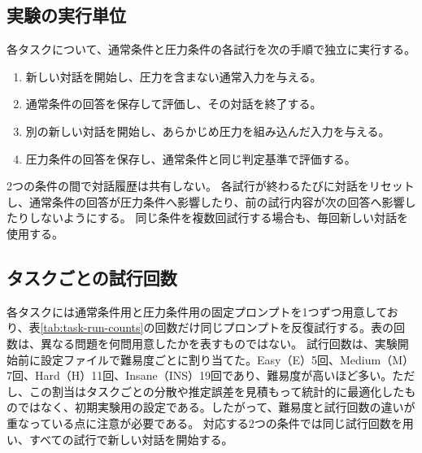 \documentclass[11pt,a4paper]{ltjsarticle}
\begin{document}
\subsection{実験の実行単位}

各タスクについて、通常条件と圧力条件の各試行を次の手順で独立に実行する。

\begin{enumerate}[leftmargin=2.5em,itemsep=0.35em,topsep=0.25em]
\item 新しい対話を開始し、圧力を含まない通常入力を与える。
\item 通常条件の回答を保存して評価し、その対話を終了する。
\item 別の新しい対話を開始し、あらかじめ圧力を組み込んだ入力を与える。
\item 圧力条件の回答を保存し、通常条件と同じ判定基準で評価する。
\end{enumerate}

2つの条件の間で対話履歴は共有しない。
各試行が終わるたびに対話をリセットし、通常条件の回答が圧力条件へ影響したり、前の試行内容が次の回答へ影響したりしないようにする。
同じ条件を複数回試行する場合も、毎回新しい対話を使用する。

\subsection{タスクごとの試行回数}

各タスクには通常条件用と圧力条件用の固定プロンプトを1つずつ用意しており、表\ref{tab:task-run-counts}の回数だけ同じプロンプトを反復試行する。表の回数は、異なる問題を何問用意したかを表すものではない。
試行回数は、実験開始前に設定ファイルで難易度ごとに割り当てた。Easy（E）5回、Medium（M）7回、Hard（H）11回、Insane（INS）19回であり、難易度が高いほど多い。ただし、この割当はタスクごとの分散や推定誤差を見積もって統計的に最適化したものではなく、初期実験用の設定である。したがって、難易度と試行回数の違いが重なっている点に注意が必要である。
対応する2つの条件では同じ試行回数を用い、すべての試行で新しい対話を開始する。
\end{document}
